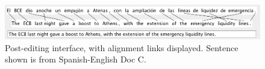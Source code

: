 

\begin{figure}
\includegraphics[width=\linewidth]{alignments_true}
\caption{Post-editing interface, with alignment links displayed. Sentence shown is from Spanish-English Doc C.}
\label{fig:screenshot_true}
\end{figure}
